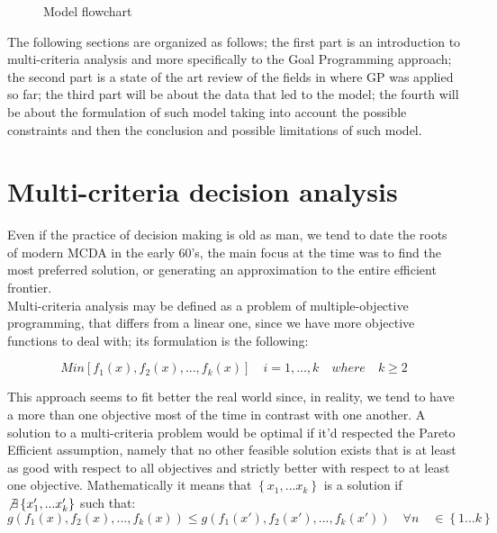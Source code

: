 \documentclass{article}
\begin{document}
\begin{figure}[htb!]
\centering
{}
\caption{Model flowchart}
\end{figure}

The following sections are organized as follows; the first part is an introduction to multi-criteria analysis and more specifically to the Goal Programming approach; the second part is a state of the art review of the fields in where GP was applied so far; the third part will be about the data that led to the model; the fourth will be about the formulation of such model taking into account the possible constraints and then the conclusion and possible limitations of such model.

\section{Multi-criteria decision analysis}
Even if the practice of decision making is old as man, we tend to date the roots of modern MCDA in the early 60's, the main focus at the time was to find the most preferred solution, or generating an approximation to the entire efficient frontier\cite{greco_multiple_2016}.
\\
Multi-criteria analysis may be defined as a problem of multiple-objective programming, that differs from a linear one,
since we have more objective functions to deal with; its formulation is the following:

\[
Min[f_1(x),f_2(x),...,f_k(x)] \quad i=1,...,k \quad where \quad k\geq2
\]

This approach seems to fit better the real world since, in reality, we tend to have a more than one objective most of the time in contrast with one another. 
A solution to a multi-criteria problem would be optimal if it'd respected the Pareto Efficient assumption, namely that no other feasible solution exists that is at least as good with respect to all objectives and strictly better with respect to at least one objective. Mathematically it means that $\left\{x_1,...x_k\right\}$ is a solution if $\not\exists \left\{x'_1,...x'_k\right\}$
such that:
\[
g(f_1(x),f_2(x),...,f_k(x)) \leq g(f_1(x'),f_2(x'),...,f_k(x')) \quad \forall n \quad \in  \left\{1...k\right\}
\]
\end{document}
